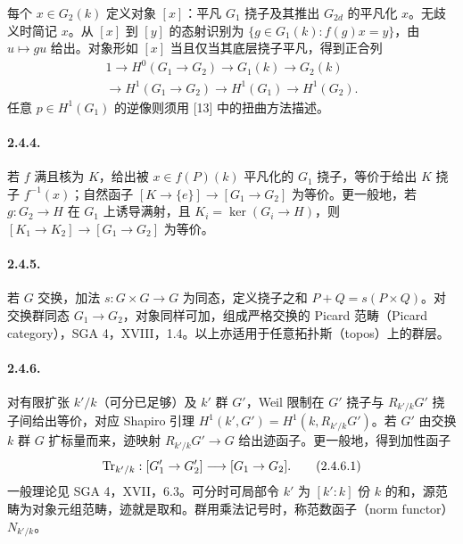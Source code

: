 每个 $x\in G_2(k)$ 定义对象 $[x]$：平凡 $G_1$ 挠子及其推出 $G_{2d}$ 的平凡化 $x$。无歧义时简记 $x$。从 $[x]$ 到 $[y]$ 的态射识别为 $\{g\in G_1(k):f(g)x=y\}$，由 $u\mapsto gu$ 给出。对象形如 $[x]$ 当且仅当其底层挠子平凡，得到正合列
\begin{equation}
 \begin{gathered}
 1\longrightarrow H^0(G_1\to G_2)\longrightarrow G_1(k)\longrightarrow G_2(k)\\
 \longrightarrow H^1(G_1\to G_2)\longrightarrow H^1(G_1)\longrightarrow H^1(G_2).
 \end{gathered}
 \tag{2.4.3.1}
\end{equation}
任意 $p\in H^1(G_1)$ 的逆像则须用 [13] 中的扭曲方法描述。
\paragraph*{2.4.4.} 若 $f$ 满且核为 $K$，给出被 $x\in f(P)(k)$ 平凡化的 $G_1$ 挠子，等价于给出 $K$ 挠子 $f^{-1}(x)$；自然函子 $[K\to\{e\}]\to[G_1\to G_2]$ 为等价。更一般地，若 $g:G_2\to H$ 在 $G_1$ 上诱导满射，且 $K_i=\ker(G_i\to H)$，则 $[K_1\to K_2]\to[G_1\to G_2]$ 为等价。
\paragraph*{2.4.5.} 若 $G$ 交换，加法 $s:G\times G\to G$ 为同态，定义挠子之和 $P+Q=s(P\times Q)$。对交换群同态 $G_1\to G_2$，对象同样可加，组成严格交换的 Picard 范畴（Picard category），SGA 4，XVIII，1.4。以上亦适用于任意拓扑斯（topos）上的群层。
\paragraph*{2.4.6.} 对有限扩张 $k'/k$（可分已足够）及 $k'$ 群 $G'$，Weil 限制在 $G'$ 挠子与 $R_{k'/k}G'$ 挠子间给出等价，对应 Shapiro 引理 $H^1(k',G')=H^1(k,R_{k'/k}G')$。若 $G'$ 由交换 $k$ 群 $G$ 扩标量而来，迹映射 $R_{k'/k}G'\to G$ 给出迹函子。更一般地，得到加性函子
\begin{equation}
 \operatorname{Tr}_{k'/k}:[G'_1\to G'_2]\longrightarrow[G_1\to G_2].
 \tag{2.4.6.1}
\end{equation}
一般理论见 SGA 4，XVII，6.3。可分时可局部令 $k'$ 为 $[k':k]$ 份 $k$ 的和，源范畴为对象元组范畴，迹就是取和。群用乘法记号时，称范数函子（norm functor）$N_{k'/k}$。
